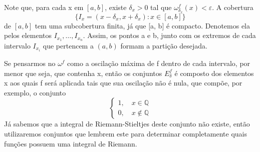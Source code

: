 \documentclass[../analysis_notes.tex]{subfiles}
\begin{document}
\begin{proof*}
	Note que, para cada x em \([a, b]\), existe \(\delta_{x}>0\) tal que \(\omega_{\delta_{x}}^{f}(x)<\varepsilon .\) A cobertura
	\[
		\{I_{x}=(x-\delta_{x}, x+\delta_{x}): x\in[a, b]\}
	\]
	de \([a, b]\) tem uma subcobertura finita, já que [a, b] é compacto. Denotemos ela pelos elementos \(I_{x_{1}}, \dotsc, I_{x_{n}}.\) Assim, os pontos a e b, junto com os extremos de cada intervalo \(I_{x_{i}}\) que pertencem a \((a, b)\) formam a partição desejada. \qedsymbol
\end{proof*}
Se pensarmos no \(\omega^{f}\) como a oscilação máxima de f dentro de cada intervalo, por menor que seja, que contenha x, então os conjuntos \(E_{\delta }^{f}\) é composto dos elementos x aos quais f será aplicada tais que sua oscilação não é nula, que compõe, por exemplo, o conjunto
\[
	\left\{\begin{array}{ll}
		1,\quad  x\in \mathbb{Q} \\
		0,\quad  x\not\in \mathbb{Q}
	\end{array}\right.
\]
Já sabemos que a integral de Riemann-Stieltjes deste conjunto não existe, então utilizaremos conjuntos que lembrem este para determinar completamente quais funções possuem uma integral de Riemann.
\end{document}
